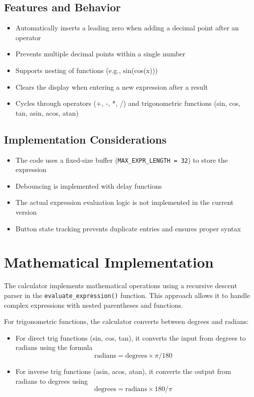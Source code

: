\documentclass{article}
\begin{document}
\subsection{Features and Behavior}
\begin{itemize}
    \item Automatically inserts a leading zero when adding a decimal point after an operator
    \item Prevents multiple decimal points within a single number
    \item Supports nesting of functions (e.g., sin(cos(x)))
    \item Clears the display when entering a new expression after a result
    \item Cycles through operators (+, -, *, /) and trigonometric functions (sin, cos, tan, asin, acos, atan)
\end{itemize}

\subsection{Implementation Considerations}
\begin{itemize}
    \item The code uses a fixed-size buffer (\texttt{MAX\_EXPR\_LENGTH = 32}) to store the expression
    \item Debouncing is implemented with delay functions
    \item The actual expression evaluation logic is not implemented in the current version
    \item Button state tracking prevents duplicate entries and ensures proper syntax
\end{itemize}
\section{Mathematical Implementation}

The calculator implements mathematical operations using a recursive descent parser in the \texttt{evaluate\_expression()} function. This approach allows it to handle complex expressions with nested parentheses and functions.

For trigonometric functions, the calculator converts between degrees and radians:
\begin{itemize}
    \item For direct trig functions (sin, cos, tan), it converts the input from degrees to radians using the formula $$ \text{radians} = \text{degrees} \times \pi / 180 $$
    \item For inverse trig functions (asin, acos, atan), it converts the output from radians to degrees using $$ \text{degrees} = \text{radians} \times 180 / \pi $$
\end{itemize}
\end{document}
